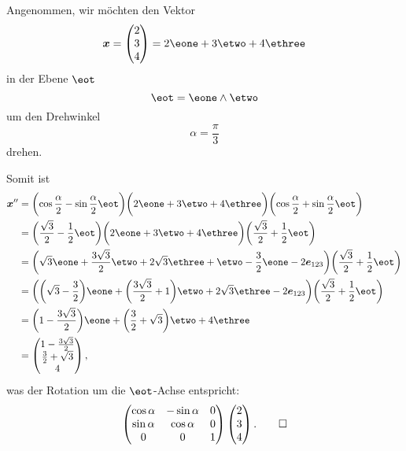 \begin{beispiel}
Angenommen, wir möchten den Vektor
  \begin{equation*}
    \boldsymbol{x} = \begin{pmatrix} 2 \\ 3 \\ 4\end{pmatrix} = 2 \eone + 3 \etwo + 4 \ethree
  \end{equation*}
in der Ebene $\eot$
  \begin{equation*}
    \eot = \eone \wedge \etwo
  \end{equation*}
um den Drehwinkel
\begin{equation*}
  \alpha = \frac{\pi}{3}
\end{equation*}
drehen.

Somit ist
  \bgroup
    \newcommand{\fraca}{\frac{\sqrt{3}}{2}}
    \newcommand{\fracb}{\frac{1}{2}}
    \begin{align*}
    \boldsymbol{x}'' &= \biggl( \cos{\frac{\alpha}{2}} - \sin{\frac{\alpha}{2}} \eot \biggr) \biggl(2 \eone + 3 \etwo + 4 \ethree\biggr) \biggl(\cos{\frac{\alpha}{2}} + \sin{\frac{\alpha}{2}} \eot\biggr) \\
      &= \biggl(\fraca - \fracb \eot \biggr) \biggl(2\eone + 3 \etwo + 4 \ethree\biggr) \biggl(\fraca + \fracb \eot \biggr) \\
      &= \biggl(\sqrt{3} \eone + \frac{3\sqrt{3}}{2} \etwo + 2\sqrt{3}\ethree + \etwo - \frac{3}{2}\eone - 2 \boldsymbol{e}_{123}\biggr) \biggl(\fraca + \fracb \eot\biggr) \\
      &= \biggl( \biggl( \sqrt{3} - \frac{3}{2} \biggr) \eone + \biggl(\frac{3\sqrt{3}}{2} + 1\biggr)\etwo + 2 \sqrt{3} \ethree - 2 \boldsymbol{e}_{123} \biggr) \biggl(\fraca + \fracb \eot\biggr) \\
      &= \biggl(1 - \frac{3 \sqrt{3}}{2}\biggr) \eone + \biggl(\frac{3}{2} + \sqrt{3}\biggr) \etwo + 4 \ethree \\
      &= \begin{pmatrix} 1 - \frac{3 \sqrt{3}}{2} \\ \frac{3}{2} + \sqrt{3} \\ 4 \end{pmatrix},
    \end{align*}
  \egroup
  was der Rotation um die $\eot$-Achse entspricht:
  \begin{equation*}
    \begin{pmatrix}
      \cos{\alpha} & -\sin{\alpha} & 0 \\
      \sin{\alpha} & \cos{\alpha} & 0 \\
      0 & 0 & 1
    \end{pmatrix} \begin{pmatrix} 2 \\ 3 \\ 4 \end{pmatrix}. \qedhere
  \end{equation*}
\end{beispiel}
